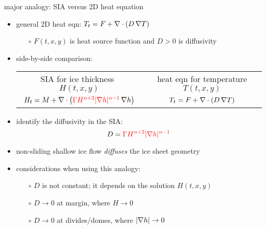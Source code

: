 \begin{frame}{major analogy: SIA versus 2D heat equation}

\begin{itemize}
\item general 2D heat eqn: \quad $T_t = F + \nabla\cdot (D\, \nabla T)$
  \begin{itemize}
  \item[$\circ$] $F(t,x,y)$ is heat source function and $D>0$ is diffusivity
  \end{itemize}
\item side-by-side comparison:

\medskip
\begin{tabular}{cc}
\scriptsize SIA for ice thickness \, $H(t,x,y)$ & \scriptsize heat eqn for temperature $T(t,x,y)$ \normalsize \medskip \\
	\hspace{-6mm} $H_t = M + \nabla\cdot \left({\color{red}\Gamma H^{n+2} |\nabla h|^{n-1}}\, \nabla h \right)$  &  $T_t = F + \nabla\cdot (D\, \nabla T)$
\end{tabular} 

\medskip
\item identify the diffusivity in the SIA:
	$$D = {\color{red}\Gamma H^{n+2} |\nabla h|^{n-1}}$$
\item non-sliding shallow ice flow \emph{diffuses} the ice sheet geometry
\item considerations when using this analogy:
  \begin{itemize}
  \item[$\circ$]  $D$ is not constant; it depends on the solution $H(t,x,y)$
  \item[$\circ$]  $D\to 0$ at margin, where $H\to 0$
  \item[$\circ$]  $D\to 0$ at divides/domes, where $|\nabla h|\to 0$
  \end{itemize}
\end{itemize}
\end{frame}


